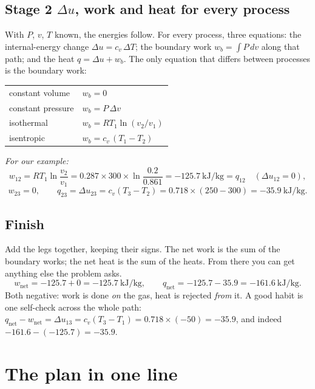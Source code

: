 \documentclass[11pt,a4paper]{article}
\newcommand{\cv}{c_{v}}
\newcommand{\wb}{w_{b}}
\begin{document}
\subsection*{Stage 2 \textemdash{} $\Delta u$, work and heat for every process}

With $P$, $v$, $T$ known, the energies follow. For every process, three
equations: the internal-energy change $\Delta u = \cv\,\Delta T$; the boundary
work $\wb = \int P\,dv$ along that path; and the heat $q = \Delta u + \wb$. The
only equation that differs between processes is the boundary work:

\begin{center}
\begin{tabular}{@{}ll@{}}
constant volume & $\wb = 0$ \\
constant pressure & $\wb = P\,\Delta v$ \\
isothermal & $\wb = RT_1\ln(v_2/v_1)$ \\
isentropic & $\wb = \cv\,(T_1 - T_2)$ \\
\end{tabular}
\end{center}

\emph{For our example:}
\[ w_{12} = RT_1\ln\frac{v_2}{v_1}
   = 0.287\times300\times\ln\frac{0.2}{0.861} = -125.7~\text{kJ/kg} = q_{12}
   \quad(\Delta u_{12}=0), \]
\[ w_{23} = 0, \qquad
   q_{23} = \Delta u_{23} = \cv(T_3 - T_2) = 0.718\times(250-300)
   = -35.9~\text{kJ/kg}. \]

\subsection*{Finish}

Add the legs together, keeping their signs. The net work is the sum of the
boundary works; the net heat is the sum of the heats. From there you can get
anything else the problem asks.
\[ w_\text{net} = -125.7 + 0 = \boxed{-125.7~\text{kJ/kg}}, \qquad
   q_\text{net} = -125.7 - 35.9 = \boxed{-161.6~\text{kJ/kg}}. \]
Both negative: work is done \emph{on} the gas, heat is rejected \emph{from} it.
A good habit is one self-check across the whole path:
$q_\text{net} - w_\text{net} = \Delta u_{13} = \cv(T_3 - T_1)
= 0.718\times(-50) = -35.9$, and indeed $-161.6 - (-125.7) = -35.9$. \checkmark

\section{The plan in one line}
\end{document}
